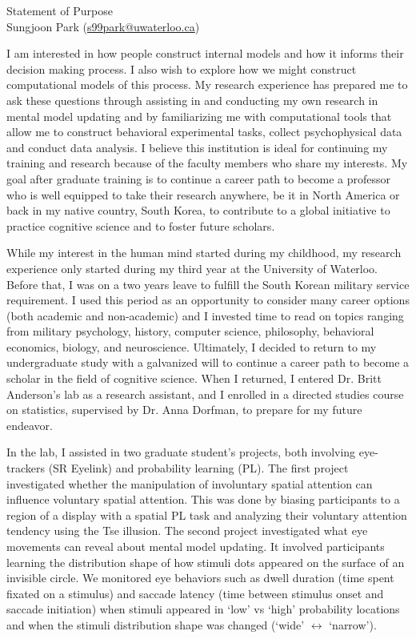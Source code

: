 \documentclass[12pt]{article}
\let\oldcenter\center
\let\oldendcenter\endcenter
\renewenvironment{center}{\setlength\topsep{-1pt}\oldcenter}{\oldendcenter}
\begin{document}
	
	\begin{center}
		{\Large Statement of Purpose} \\
		{\normalsize Sungjoon Park (\href{mailto:s99park@uwaterloo.ca}{s99park@uwaterloo.ca})}
	\end{center}
	
	I am interested in how people construct internal models and how it informs their decision making process. I also wish to explore how we might construct computational models of this process. My research experience has prepared me to ask these questions through assisting in and conducting my own research in mental model updating and by familiarizing me with computational tools that allow me to construct behavioral experimental tasks, collect psychophysical data and conduct data analysis. I believe this institution is ideal for continuing my training and research because of the faculty members who share my interests. My goal after graduate training is to continue a career path to become a professor who is well equipped to take their research anywhere, be it in North America or back in my native country, South Korea, to contribute to a global initiative to practice cognitive science and to foster future scholars.
	
	While my interest in the human mind started during my childhood, my research experience only started during my third year at the University of Waterloo. Before that, I was on a two years leave to fulfill the South Korean military service requirement. I used this period as an opportunity to consider many career options (both academic and non-academic) and I invested time to read on topics ranging from military psychology, history, computer science, philosophy, behavioral economics, biology, and neuroscience. Ultimately, I decided to return to my undergraduate study with a galvanized will to continue a career path to become a scholar in the field of cognitive science. When I returned, I entered Dr. Britt Anderson’s lab as a research assistant, and I enrolled in a directed studies course on statistics, supervised by Dr. Anna Dorfman, to prepare for my future endeavor.
	
	In the lab, I assisted in two graduate student's projects, both involving eye-trackers (SR Eyelink) and probability learning (PL). The first project investigated whether the manipulation of involuntary spatial attention can influence voluntary spatial attention. This was done by biasing participants to a region of a display with a spatial PL task and analyzing their voluntary attention tendency using the Tse illusion. The second project investigated what eye movements can reveal about mental model updating. It involved participants learning the distribution shape of how stimuli dots appeared on the surface of an invisible circle. We monitored eye behaviors such as dwell duration (time spent fixated on a stimulus) and saccade latency (time between stimulus onset and saccade initiation) when stimuli appeared in `low' vs `high' probability locations and when the stimuli distribution shape was changed (`wide' $\leftrightarrow$ `narrow').
	
\end{document}
